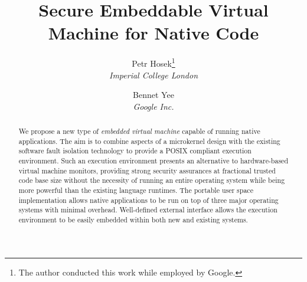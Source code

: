 \documentclass[twocolumn,10pt]{article}
\begin{document}
\title{\bf Secure Embeddable Virtual Machine for Native Code}
\author{
Petr Hosek\footnote{The author conducted this work while employed by
Google.}\\\textit{Imperial College London}
\and Bennet Yee\\\textit{Google Inc.}
}
\date{}
\maketitle
\thispagestyle{empty}

\begin{abstract}
  We propose a new type of \emph{embedded virtual machine} capable of
  running native applications. The aim is to combine aspects of a
  microkernel design with the existing software fault isolation
  technology to provide a POSIX compliant execution environment. Such an
  execution environment presents an alternative to hardware-based
  virtual machine monitors, providing strong security assurances at
  fractional trusted code base size without the necessity of running an
  entire operating system while being more powerful than the existing
  language runtimes.  The portable user space implementation allows
  native applications to be run on top of three major operating systems
  with minimal overhead.  Well-defined external interface allows the
  execution environment to be easily embedded within both new and
  existing systems.




\end{abstract}








{
  
  
}
\end{document}
